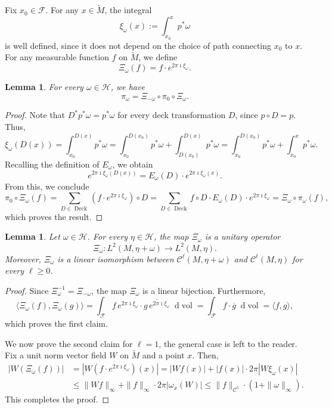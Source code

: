 \documentclass[11pt,letterpaper]{amsart}
\newcommand \cF {{\mathcal F}}
\newcommand \cH {{\mathcal H}}
\newcommand \tM {{\widetilde M}}
\newcommand*{\diff}{\mathop{}\!\mathrm{d}}
\DeclareMathOperator{\vol}{vol}
\DeclareMathOperator{\Deck}{Deck}
\newtheorem {lemma}[theorem]{Lemma}
\theoremstyle{definition}
\begin{document}
Fix $x_0 \in \cF$. For any $x \in \tM$, the integral 
\begin{equation}\label{eq:roof}
\xi_\omega(x):= \int_{x_0}^x p^\ast \omega
\end{equation}
is well defined, since it does not depend on the choice of path connecting $x_0$ to $x$. 
For any measurable function $f$ on $\tM$, we define 
\[
\Xi_\omega(f) = f \cdot e^{2 \pi \imath \xi_\omega}.
\]


\begin{lemma}\label{lem:proj_Xi}
For every $\omega \in \cH$, we have
\[
\pi_\omega = \Xi_{-\omega} \circ \pi_0 \circ \Xi_{\omega}.
\]
\end{lemma}
\begin{proof}
Note that $D^\ast p^\ast \omega = p^\ast \omega$ for every deck transformation $D$, since $p \circ D = p$. Thus, 
\[
\xi_\omega(D(x)) = \int_{x_0}^{D(x)} p^\ast \omega = \int_{x_0}^{D(x_0)} p^\ast \omega + \int_{D(x_0)}^{D(x)} p^\ast \omega = \int_{x_0}^{D(x_0)} p^\ast \omega + \int_{x_0}^{x} p^\ast \omega.
\]
Recalling the definition of $E_\omega$, we obtain
\begin{equation}\label{eq:xi_and_D}
e^{2\pi \imath \xi_\omega(D(x))} = E_\omega(D) \cdot e^{2\pi \imath \xi_\omega(x)}. 
\end{equation}
From this, we conclude
\[
\pi_0 \circ \Xi_{\omega}(f) = \sum_{D\in \Deck} ( f \cdot e^{2 \pi \imath \xi_\omega}) \circ D =  \sum_{D\in \Deck} f \circ D \cdot E_\omega(D) \cdot e^{2\pi \imath \xi_\omega}= \Xi_{\omega}\circ \pi_{\omega}(f),
\]
which proves the result.
\end{proof}

\begin{lemma}\label{lem:isom_L2omega}
Let $\omega \in \cH$. For every $\eta \in \cH$, the map $\Xi_{\omega}$ is a unitary operator
\[
\Xi_{\omega} \colon  L^2(M,\eta + \omega) \to  L^2(M,\eta).
\]
Moreover, $\Xi_\omega$ is a linear isomorphism between $\mathscr{C}^\ell(M,\eta + \omega)$ and $\mathscr{C}^\ell(M,\eta)$ for every $\ell \geq 0$.
\end{lemma}
\begin{proof}
Since $\Xi_\omega^{-1} = \Xi_{-\omega}$, the map $\Xi_\omega$ is a linear bijection. Furthermore, 
\[
\langle \Xi_\omega(f), \Xi_\omega(g)\rangle = \int_\cF f \, e^{2 \pi \imath \xi_\omega} \cdot \overline{g \, e^{2 \pi \imath \xi_\omega}} \diff \vol = \int_\cF f  \cdot \overline{g} \diff \vol = \langle f, g\rangle,
\]
which proves the first claim.

We now prove the second claim for $\ell = 1$, the general case is left to the reader. Fix a unit norm vector field $W$ on $\tM$ and a point $x$. Then,
\begin{equation}\label{eq:vect-field}
\begin{split}
|W(\Xi_\omega(f))| &= |W(f \cdot e^{2\pi \imath \xi_\omega})(x)| = |Wf(x)| + |f(x)| \cdot 2\pi |W\xi_\omega(x)| \\
&\leq \|Wf\|_\infty + \|f\|_\infty \cdot 2 \pi |\omega_x(W)| \leq \|f\|_{\mathscr{C}^1} \cdot (1+\|\omega\|_\infty).
\end{split}
\end{equation}
This completes the proof.
\end{proof}
\end{document}
